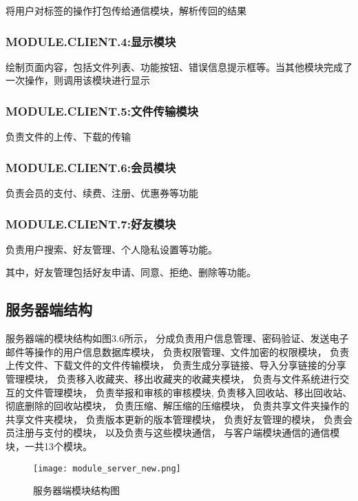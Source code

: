 将用户对标签的操作打包传给通信模块，解析传回的结果

\subsubsection{MODULE.CLIENT.4:显示模块}
绘制页面内容，包括文件列表、功能按钮、错误信息提示框等。当其他模块完成了一次操作，则调用该模块进行显示 

\subsubsection{MODULE.CLIENT.5:文件传输模块}
负责文件的上传、下载的传输

{
\color{red}

\subsubsection{MODULE.CLIENT.6:会员模块}
负责会员的支付、续费、注册、优惠券等功能

 
\subsubsection{MODULE.CLIENT.7:好友模块}
负责用户搜索、好友管理、个人隐私设置等功能。

其中，好友管理包括好友申请、同意、拒绝、删除等功能。
}

\subsection{服务器端结构}
服务器端的模块结构如图3.6所示，
分成负责用户信息管理、密码验证、发送电子邮件等操作的用户信息数据库模块，
负责权限管理、文件加密的权限模块，
负责上传文件、下载文件的文件传输模块，
负责生成分享链接、导入分享链接的分享管理模块，
负责移入收藏夹、移出收藏夹的收藏夹模块，
负责与文件系统进行交互的文件管理模块，%
负责举报和审核的审核模块,
负责移入回收站、移出回收站、彻底删除的回收站模块，
负责压缩、解压缩的压缩模块，
负责共享文件夹操作的共享文件夹模块，
负责版本更新的版本管理模块，
{\color{red}
负责好友管理的模块，
负责会员注册与支付的模块，}
以及负责与这些模块通信，
与客户端模块通信的通信模块，一共13个模块。

\begin{figure}[!h] 
\centering   
\texttt{[image: module\_server\_new.png]}
\caption{服务器端模块结构图}\label{fig:noted-figure}
\end{figure}

